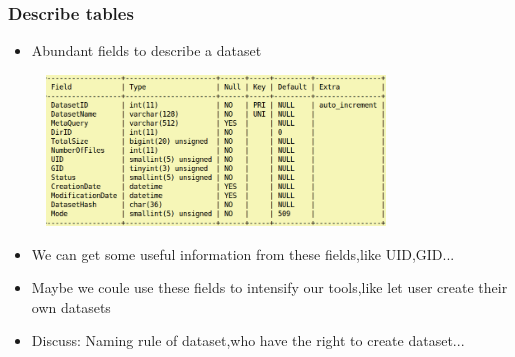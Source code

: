 \documentclass{beamer}
\begin{document}
\begin{frame}
  \frametitle{Describe tables}
  \begin{itemize}
    \item Abundant fields to describe a dataset 
  \end{itemize}
  \hspace{0.5cm} 
  \includegraphics[height=4cm,width=11cm,keepaspectratio]{data/FC_MetaDatasets.png}
  \begin{itemize}
    \item We can get some useful information from these fields,like UID,GID... 
    \item Maybe we coule use these fields to intensify our tools,like let user create their own datasets
    \item Discuss: Naming rule of dataset,who have the right to create dataset...
  \end{itemize}
\end{frame}
\end{document}
